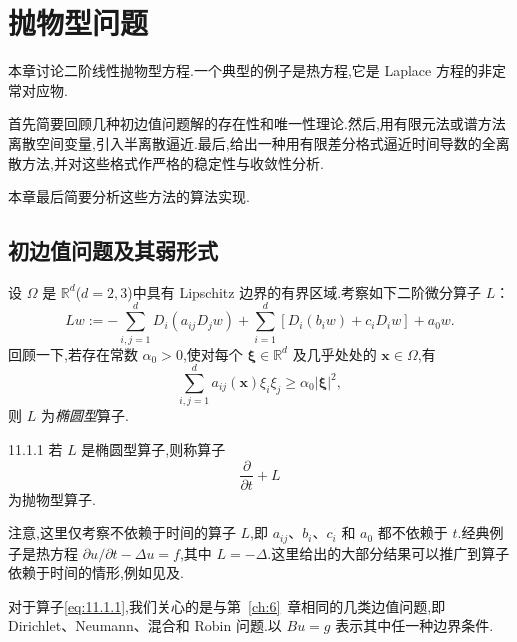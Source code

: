\chapter{抛物型问题}\label{ch:11}

本章讨论二阶线性抛物型方程.一个典型的例子是热方程,它是 Laplace 方程的非定常对应物.

首先简要回顾几种初边值问题解的存在性和唯一性理论.然后,用有限元法或谱方法离散空间变量,引入半离散逼近.最后,给出一种用有限差分格式逼近时间导数的全离散方法,并对这些格式作严格的稳定性与收敛性分析.

本章最后简要分析这些方法的算法实现.

\section{初边值问题及其弱形式}\label{sec:11.1}

设 \(\Omega\) 是 \(\mathbb R^d\)(\(d=2,3\))中具有 Lipschitz 边界的有界区域.考察如下二阶微分算子 \(L\)：
\begin{equation}\label{eq:11.1.1}
  Lw:=-\sum_{i,j=1}^dD_i(a_{ij}D_jw)
      +\sum_{i=1}^d[D_i(b_iw)+c_iD_iw]+a_0w.
\end{equation}
回顾一下,若存在常数 \(\alpha_0>0\),使对每个 \(\boldsymbol{\xi}\in\mathbb R^d\) 及几乎处处的 \(\boldsymbol{x}\in\Omega\),有
\begin{equation}\label{eq:11.1.2}
  \sum_{i,j=1}^d a_{ij}(\boldsymbol{x})\xi_i\xi_j\ge\alpha_0|\boldsymbol{\xi}|^2,
\end{equation}
则 \(L\) 为\emph{椭圆型}算子.

\begin{definition}[]{11.1.1}
若 \(L\) 是椭圆型算子,则称算子
\begin{equation}\label{eq:11.1.3}
  \frac{\partial}{\partial t}+L
\end{equation}
为{\heiti 抛物型算子}.
\end{definition}

注意,这里仅考察不依赖于时间的算子 \(L\),即 \(a_{ij}\)、\(b_i\)、\(c_i\) 和 \(a_0\) 都不依赖于 \(t\).经典例子是热方程 \(\partial u/\partial t-\Delta u=f\),其中 \(L=-\Delta\).这里给出的大部分结果可以推广到算子依赖于时间的情形,例如见及.

对于算子\eqref{eq:11.1.1},我们关心的是与第~\ref{ch:6}~章相同的几类边值问题,即 Dirichlet、Neumann、混合和 Robin 问题.以 \(Bu=g\) 表示其中任一种边界条件.

